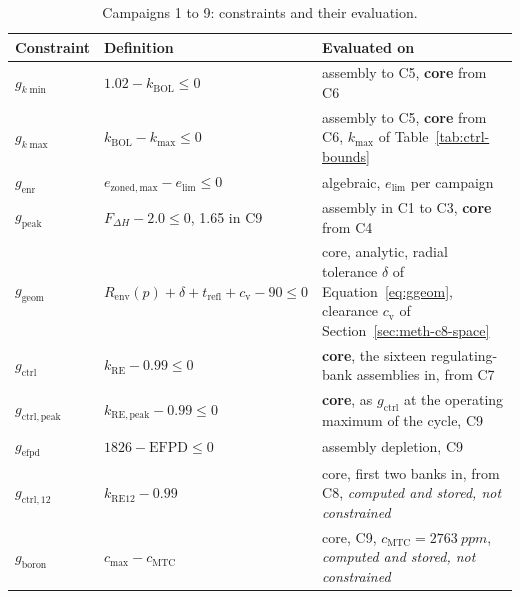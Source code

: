 \begin{table}[htbp]
  \centering
  \small
  \caption{Campaigns 1 to 9: constraints and their evaluation.}
  \label{tab:constraints}
\begin{tabularx}{\textwidth}{
    >{\raggedright\arraybackslash}p{}
    >{\raggedright\arraybackslash}p{}
    >{\raggedright\arraybackslash}X
}
    \toprule
    Constraint & Definition & Evaluated on \\
    \midrule
    $g_{k\min}$ 
        & $1.02 - k_\mathrm{BOL} \le 0$
        & assembly to C5, \textbf{core} from C6 \\

    $g_{k\max}$ 
        & $k_\mathrm{BOL} - k_{\max} \le 0$
        & assembly to C5, \textbf{core} from C6, 
          $k_{\max}$ of Table~\ref{tab:ctrl-bounds} \\

    $g_\mathrm{enr}$ 
        & $e_\mathrm{zoned,max} - e_\mathrm{lim} \le 0$
        & algebraic, $e_\mathrm{lim}$ per campaign \\

    $g_\mathrm{peak}$ 
        & $F_{\Delta H} - 2.0 \le 0$, 1.65 in C9
        & assembly in C1 to C3, \textbf{core} from C4 \\

    $g_\mathrm{geom}$ 
        & $R_\mathrm{env}(p) + \delta + t_\mathrm{refl} + c_\mathrm{v} - 90 \le 0$
        & core, analytic, radial tolerance $\delta$ of
          Equation~\eqref{eq:ggeom}, clearance $c_\mathrm{v}$ of 
          Section~\ref{sec:meth-c8-space} \\

    $g_\mathrm{ctrl}$ 
        & $k_\mathrm{RE} - 0.99 \le 0$
        & \textbf{core}, the sixteen regulating-bank assemblies in,
          from C7 \\

    $g_\mathrm{ctrl,peak}$
        & $k_\mathrm{RE,peak} - 0.99 \le 0$
        & \textbf{core}, as $g_\mathrm{ctrl}$ at the operating maximum of
          the cycle, C9 \\

    $g_\mathrm{efpd}$
        & $1826 - \mathrm{EFPD} \le 0$
        & assembly depletion, C9 \\

    $g_\mathrm{ctrl,12}$ 
        & $k_\mathrm{RE12} - 0.99$
        & core, first two banks in, from C8, 
          \emph{computed and stored, not constrained} \\

    $g_\mathrm{boron}$
        & $c_\mathrm{max} - c_\mathrm{MTC}$
        & core, C9, $c_\mathrm{MTC} = \SI{2763}{ppm}$,
          \emph{computed and stored, not constrained} \\
    \bottomrule
\end{tabularx}
\end{table}

